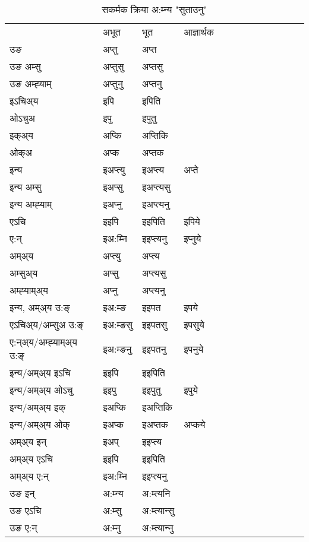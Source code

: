 \begin{table}[H]
\centering
\caption{\label{ipt.vt} सकर्मक क्रिया  अ:म्‍न्य  "सुताउनु"  }
\begin{tabular}{l|l|l|l|l|l|l|l|l|l|l|l|l}  \toprule
&अभूत & भूत & आज्ञार्थक \\ 
उङ &अप्‍तु &अप्‍त \\ 
उङ अम्सु&अप्‍तुसु &अप्‍तसु \\ 
उङ अम्ह्‍याम्&अप्‍तुनु &अप्‍तनु \\ 
इऽचिअ्य &इपि &इपिति   \\ 
ओऽचुअ        &इपु &इपुतु   \\ 
इक्अ्य&अप्कि &अप्‍तिकि   \\ 
ओक्अ &अप्क &अप्‍तक   \\ 
इन्य & इअप्‍त्यु  & इअप्‍त्य &अप्‍ते  \\ 
इन्य अम्सु& इअप्सु  & इअप्‍त्यसु   \\ 
इन्य अम्ह्‍याम्& इअप्‍नु  & इअप्‍त्यनु   \\ 
एऽचि & इइपि & इइपिति &इपिये    \\ 
ए:न् & इअ:म्‍नि  & इइप्‍त्यनु &इप्‍नुये  \\ 
अम्अ्य & अप्‍त्यु  & अप्‍त्य  \\ 
अम्सुअ्य & अप्सु & अप्‍त्यसु  \\ 
अम्ह्‍याम्अ्य & अप्‍नु  & अप्‍त्यनु \\ 
\midrule
इन्य, अम्अ्य उ:ङ्‌ &इअ:म्ङ &इइपत &इपये \\ 
एऽचिअ्य/अम्सुअ उ:ङ्‌ &इअ:म्ङसु &इइपतसु &इपसुये \\ 
ए:न्अ्य/अम्ह्‍याम्अ्य उ:ङ्‌ &इअ:म्ङनु &इइपतनु &इपनुये \\ 
इन्य/अम्अ्य इऽचि &इइपि &इइपिति    \\ 
इन्य/अम्अ्य ओऽचु &इइपु &इइपुतु  &इपुये  \\ 
इन्य/अम्अ्य इक् &इअप्कि &इअप्‍तिकि   \\ 
इन्य/अम्अ्य ओक् &इअप्क &इअप्‍तक  &अप्कये  \\ 
अम्अ्य इन् & इअप् & इइप्‍त्य   \\ 
अम्अ्य एऽचि & इइपि & इइपिति    \\ 
अम्अ्य ए:न् & इअ:म्‍नि  & इइप्‍त्यनु  \\ 
\midrule
उङ इन् & अ:म्‍न्य  & अ:म्त्यनि  \\ 
उङ एऽचि & अ:म्सु  & अ:म्त्यान्सु   \\ 
उङ ए:न्& अ:म्‍नु  & अ:म्त्यान्‍नु   \\ 
\bottomrule
\end{tabular}
\end{table}


